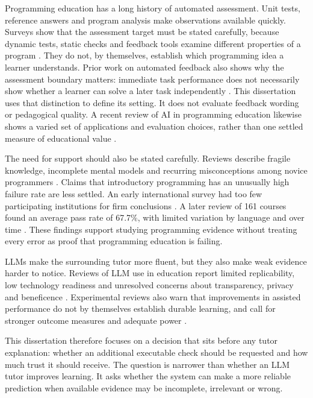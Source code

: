 Programming education has a long history of automated assessment. Unit tests, reference answers and program analysis make
observations available quickly. Surveys show that the assessment target must be stated carefully, because dynamic tests,
static checks and feedback tools examine different properties of a program \parencite{alamutka2005assessment,ihantola2010assessment}.
They do not, by themselves, establish which programming idea a learner understands. Prior work on automated feedback also
shows why the assessment boundary matters: immediate task performance does not necessarily show whether a learner can solve a
later task independently \parencite{keuning2018systematic,cavalcanti2021automatic}. This dissertation uses that distinction
to define its setting. It does not evaluate feedback wording or pedagogical quality. A recent review of AI in programming
education likewise shows a varied set of applications and evaluation choices, rather than one settled measure of educational
value \parencite{manorat2025artificial}.

The need for support should also be stated carefully. Reviews describe fragile knowledge, incomplete mental models and recurring
misconceptions among novice programmers \parencite{robins2003programming,qian2018misconceptions,luxtonreilly2018introductory}.
Claims that introductory programming has an unusually high failure rate are less settled. An early international survey had
too few participating institutions for firm conclusions \parencite{bennedsen2007failure}. A later review of 161 courses found
an average pass rate of 67.7\%, with limited variation by language and over time \parencite{watson2014failure}. These findings
support studying programming evidence without treating every error as proof that programming education is failing.

LLMs make the surrounding tutor more fluent, but they also make weak evidence harder to notice. Reviews of LLM use in
education report limited replicability, low technology readiness and unresolved concerns about transparency, privacy and
beneficence \parencite{yan2024practical}. Experimental reviews also warn that improvements in assisted performance do not by
themselves establish durable learning, and call for stronger outcome measures and adequate power \parencite{deng2024chatgpt}.

This dissertation therefore focuses on a decision that sits before any tutor explanation: whether an additional executable check
should be requested and how much trust it should receive. The question is narrower than whether an LLM tutor improves learning.
It asks whether the system can make a more reliable prediction when available evidence may be incomplete, irrelevant or wrong.

